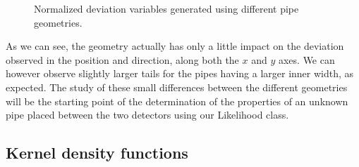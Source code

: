 \documentclass[a4paper, 11pt, twoside, openright]{report}
\begin{document}
\begin{figure}[htbp]
{\begin{minipage}[b]{.49\textwidth}
\end{minipage} \hfill
}
\caption{Normalized deviation variables generated using different pipe geometries.}
\label{fig:gemComp}
\end{figure}

As we can see, the geometry actually has only a little impact on the deviation observed in the position and direction, along both the $x$ and $y$ axes. We can however observe slightly larger tails for the pipes having a larger inner width, as expected. The study of these small differences between the different geometries will be the starting point of the determination of the properties of an unknown pipe placed between the two detectors using our Likelihood class.

\subsection{Kernel density functions}
\end{document}

